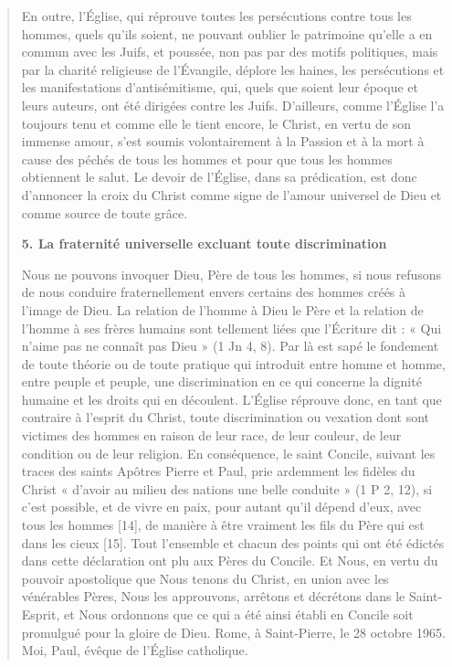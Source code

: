 \begin{quote}
En outre, l’Église, qui réprouve toutes les persécutions contre tous les hommes, quels qu’ils soient, ne pouvant oublier le patrimoine qu’elle a en commun avec les Juifs, et poussée, non pas par des motifs politiques, mais par la charité religieuse de l’Évangile, déplore les haines, les persécutions et les manifestations d’antisémitisme, qui, quels que soient leur époque et leurs auteurs, ont été dirigées contre les Juifs.
D’ailleurs, comme l’Église l’a toujours tenu et comme elle le tient encore, le Christ, en vertu de son immense amour, s’est soumis volontairement à la Passion et à la mort à cause des péchés de tous les hommes et pour que tous les hommes obtiennent le salut. Le devoir de l’Église, dans sa prédication, est donc d’annoncer la croix du Christ comme signe de l’amour universel de Dieu et comme source de toute grâce.


\textbf{5. La fraternité universelle excluant toute discrimination}


Nous ne pouvons invoquer Dieu, Père de tous les hommes, si nous refusons de nous conduire fraternellement envers certains des hommes créés à l’image de Dieu. La relation de l’homme à Dieu le Père et la relation de l’homme à ses frères humains sont tellement liées que l’Écriture dit : « Qui n’aime pas ne connaît pas Dieu » (1 Jn 4, 8). Par là est sapé le fondement de toute théorie ou de toute pratique qui introduit entre homme et homme, entre peuple et peuple, une discrimination en ce qui concerne la dignité humaine et les droits qui en découlent.
L’Église réprouve donc, en tant que contraire à l’esprit du Christ, toute discrimination ou vexation dont sont victimes des hommes en raison de leur race, de leur couleur, de leur condition ou de leur religion. En conséquence, le saint Concile, suivant les traces des saints Apôtres Pierre et Paul, prie ardemment les fidèles du Christ « d’avoir au milieu des nations une belle conduite » (1 P 2, 12), si c’est possible, et de vivre en paix, pour autant qu’il dépend d’eux, avec tous les hommes [14], de manière à être vraiment les fils du Père qui est dans les cieux [15].
Tout l’ensemble et chacun des points qui ont été édictés dans cette déclaration ont plu aux Pères du Concile. Et Nous, en vertu du pouvoir apostolique que Nous tenons du Christ, en union avec les vénérables Pères, Nous les approuvons, arrêtons et décrétons dans le Saint-Esprit, et Nous ordonnons que ce qui a été ainsi établi en Concile soit promulgué pour la gloire de Dieu.
Rome, à Saint-Pierre, le 28 octobre 1965.
Moi, Paul, évêque de l’Église catholique.


\end{quote}

